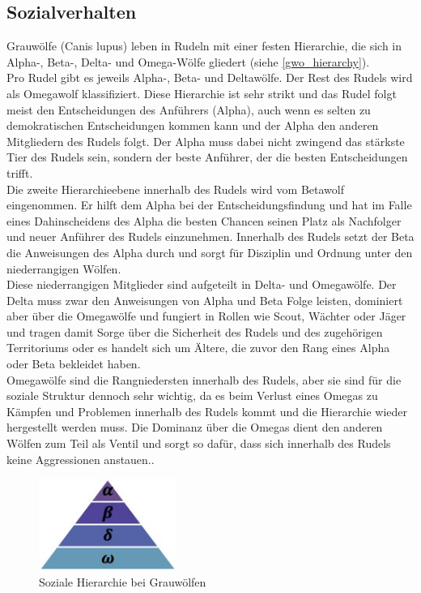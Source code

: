 \subsection{Sozialverhalten}
Grauwölfe (Canis lupus) leben in Rudeln mit einer festen Hierarchie, die sich in Alpha-, Beta-, Delta- und Omega-Wölfe gliedert (siehe \autoref{gwo_hierarchy}). \\
Pro Rudel gibt es jeweils  Alpha-, Beta- und Deltawölfe. Der Rest des Rudels wird als Omegawolf klassifiziert. Diese Hierarchie ist sehr strikt und das Rudel folgt meist den Entscheidungen des Anführers (Alpha), auch wenn es selten zu demokratischen Entscheidungen kommen kann und der Alpha den anderen Mitgliedern des Rudels folgt. Der Alpha muss dabei nicht zwingend das stärkste Tier des Rudels sein, sondern der beste Anführer, der die besten Entscheidungen trifft. \\
Die zweite Hierarchieebene innerhalb des Rudels wird vom Betawolf eingenommen. Er hilft dem Alpha bei der Entscheidungsfindung und hat im Falle eines Dahinscheidens des Alpha die besten Chancen seinen Platz als Nachfolger und neuer Anführer des Rudels einzunehmen. Innerhalb des Rudels setzt der Beta die Anweisungen des Alpha durch und sorgt für Disziplin und Ordnung unter den niederrangigen Wölfen.\\
Diese niederrangigen Mitglieder sind aufgeteilt in Delta- und Omegawölfe. Der Delta muss zwar den Anweisungen von Alpha und Beta Folge leisten, dominiert aber über die Omegawölfe und fungiert in Rollen wie Scout, Wächter oder Jäger und tragen damit Sorge über die Sicherheit des Rudels und des zugehörigen Territoriums oder es handelt sich um Ältere, die zuvor den Rang eines Alpha oder Beta bekleidet haben.\\
Omegawölfe sind die Rangniedersten innerhalb des Rudels, aber sie sind für die soziale Struktur dennoch sehr wichtig, da es beim Verlust eines Omegas zu Kämpfen und Problemen innerhalb des Rudels kommt und die Hierarchie wieder hergestellt werden muss. Die Dominanz über die Omegas dient den anderen Wölfen zum Teil als Ventil und sorgt so dafür, dass sich innerhalb des Rudels keine Aggressionen anstauen.\cite[vgl. Mirjalili 2014, S.4f]{MIRJALILI201446}.\\

\begin{figure}[ht]
    \begin{center}
        \includegraphics[width=0.4\textwidth]{assets/img/Grey_wolf_social_hierarchy.jpg}
        \caption[Soziale Hierarchie bei Grauwölfen]{Soziale Hierarchie bei Grauwölfen \cite{MIRJALILI201446}}
        \label{gwo_hierarchy}
    \end{center}
\end{figure}

